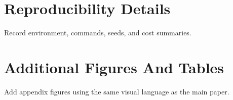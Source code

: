 \section{Reproducibility Details}

Record environment, commands, seeds, and cost summaries.

\section{Additional Figures And Tables}

Add appendix figures using the same visual language as the main paper.

